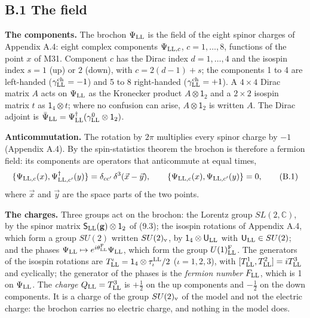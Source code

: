 \documentclass[
  10pt,
]{article}
\begin{document}
\hypertarget{b.1-the-field}{%
\subsection{B.1 The field}\label{b.1-the-field}}

\textbf{The components.} The brochon \(\Psi_{\rm LL}\) is the field of
the eight spinor charges of Appendix A.4: eight complex components
\(\Psi_{{\rm LL},c}\), \(c=1,\dots,8\), functions of the point \(x\) of
M31. Component \(c\) has the Dirac index \(d=1,\dots,4\) and the isospin
index \(s=1\) (up) or \(2\) (down), with \(c=2(d-1)+s\); the components
1 to 4 are left-handed (\(\gamma^{\rm ch}_{\rm LL}=-1\)) and 5 to 8
right-handed (\(\gamma^{\rm ch}_{\rm LL}=+1\)). A \(4\times4\) Dirac
matrix \(A\) acts on \(\Psi_{\rm LL}\) as the Kronecker product
\(A\otimes\mathsf 1_2\) and a \(2\times2\) isospin matrix \(t\) as
\(\mathsf 1_4\otimes t\); where no confusion can arise,
\(A\otimes\mathsf 1_2\) is written \(A\). The Dirac adjoint is
\(\bar\Psi_{\rm LL}=\Psi^\dagger_{\rm LL}(\gamma^0_{\rm LL}\otimes\mathsf 1_2)\).

\textbf{Anticommutation.} The rotation by \(2\pi\) multiplies every
spinor charge by \(-1\) (Appendix A.4). By the spin-statistics theorem
the brochon is therefore a fermion field: its components are operators
that anticommute at equal times,
\[\{\Psi_{{\rm LL},c}(x),\Psi^\dagger_{{\rm LL},c'}(y)\}=\delta_{cc'}\,\delta^3(\vec x-\vec y),\qquad\{\Psi_{{\rm LL},c}(x),\Psi_{{\rm LL},c'}(y)\}=0,\tag{B.1}\]
where \(\vec x\) and \(\vec y\) are the space parts of the two points.

\textbf{The charges.} Three groups act on the brochon: the Lorentz group
\(SL(2,\mathbb C)\), by the spinor matrix
\(\mathsf S_{\rm LL}(\mathbf g)\otimes\mathsf 1_2\) of (9.3); the
isospin rotations of Appendix A.4, which form a group \(SU(2)\) written
\(SU(2)_{\rm v}\), by \(\mathsf 1_4\otimes\mathsf U_{\rm LL}\) with
\(\mathsf U_{\rm LL}\in SU(2)\); and the phases
\(\Psi_{\rm LL}\mapsto e^{i\theta^{\rm F}_{\rm LL}}\Psi_{\rm LL}\),
which form the group \(U(1)^{\rm F}_{\rm LL}\). The generators of the
isospin rotations are
\(T^\iota_{\rm LL}=\mathsf 1_4\otimes\tau^{\rm LL}_\iota/2\)
(\(\iota=1,2,3\)), with \([T^1_{\rm LL},T^2_{\rm LL}]=iT^3_{\rm LL}\)
and cyclically; the generator of the phases is the \emph{fermion number}
\(F_{\rm LL}\), which is 1 on \(\Psi_{\rm LL}\). The \emph{charge}
\(Q_{\rm LL}=T^3_{\rm LL}\) is \(+\tfrac12\) on the up components and
\(-\tfrac12\) on the down components. It is a charge of the group
\(SU(2)_{\rm v}\) of the model and not the electric charge: the brochon
carries no electric charge, and nothing in the model does.
\end{document}
